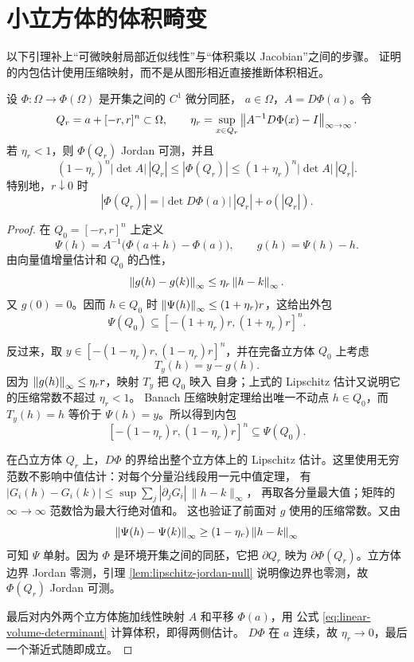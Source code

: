 \section{小立方体的体积畸变}

以下引理补上“可微映射局部近似线性”与“体积乘以 Jacobian”之间的步骤。
证明的内包估计使用压缩映射，而不是从图形相近直接推断体积相近。

\begin{lemma}[局部体积畸变]
\label{lem:local-volume-distortion}
设 \(\Phi:\Omega\to\Phi(\Omega)\) 是开集之间的 \(C^1\) 微分同胚，
\(a\in\Omega\)，\(A=D\Phi(a)\)。令
\[
 Q_r=a+[-r,r]^n\subset\Omega,
 \qquad
 \eta_r=\sup_{x\in Q_r}
 \left\lVert A^{-1}D\Phi(x)-I\right\rVert_{\infty\to\infty}.
\]
若 \(\eta_r<1\)，则 \(\Phi(Q_r)\) Jordan 可测，并且
\[
 (1-\eta_r)^n|\det A|\,|Q_r|
 \le |\Phi(Q_r)|
 \le(1+\eta_r)^n|\det A|\,|Q_r|.
\]
特别地，\(r\downarrow0\) 时
\[
 |\Phi(Q_r)|
 =|\det D\Phi(a)|\,|Q_r|+o(|Q_r|).
\]
\end{lemma}

\begin{proof}
在 \(Q_0=[-r,r]^n\) 上定义
\[
 \Psi(h)=A^{-1}\bigl(\Phi(a+h)-\Phi(a)\bigr),
 \qquad g(h)=\Psi(h)-h.
\]
由向量值增量估计和 \(Q_0\) 的凸性，
\[
 \left\lVert g(h)-g(k)\right\rVert_\infty
 \le\eta_r\left\lVert h-k\right\rVert_\infty.
\]
又 \(g(0)=0\)。因而 \(h\in Q_0\) 时
\(\left\lVert\Psi(h)\right\rVert_\infty\le(1+\eta_r)r\)，这给出外包
\[
 \Psi(Q_0)\subseteq[-(1+\eta_r)r,(1+\eta_r)r]^n.
\]

反过来，取
\(y\in[-(1-\eta_r)r,(1-\eta_r)r]^n\)，并在完备立方体 \(Q_0\) 上考虑
\[
 T_y(h)=y-g(h).
\]
因为 \(\left\lVert g(h)\right\rVert_\infty\le\eta_rr\)，映射 \(T_y\) 把 \(Q_0\) 映入
自身；上式的 Lipschitz 估计又说明它的压缩常数不超过 \(\eta_r<1\)。
Banach 压缩映射定理给出唯一不动点 \(h\in Q_0\)，而
\(T_y(h)=h\) 等价于 \(\Psi(h)=y\)。所以得到内包
\[
 [-(1-\eta_r)r,(1-\eta_r)r]^n\subseteq\Psi(Q_0).
\]

在凸立方体 \(Q_r\) 上，\(D\Phi\) 的界给出整个立方体上的 Lipschitz
估计。这里使用无穷范数不影响中值估计：对每个分量沿线段用一元中值定理，
有 \(|G_i(h)-G_i(k)|\le\sup\sum_j|\partial_jG_i|\,\|h-k\|_\infty\)，
再取各分量最大值；矩阵的 \(\infty\to\infty\) 范数恰为最大行绝对值和。
这也验证了前面对 \(g\) 使用的压缩常数。又由
\[
 \left\lVert\Psi(h)-\Psi(k)\right\rVert_\infty
 \ge(1-\eta_r)\left\lVert h-k\right\rVert_\infty
\]
可知 \(\Psi\) 单射。因为 \(\Phi\) 是环境开集之间的同胚，它把
\(\partial Q_r\) 映为 \(\partial\Phi(Q_r)\)。立方体边界 Jordan 零测，引理
\ref{lem:lipschitz-jordan-null} 说明像边界也零测，故 \(\Phi(Q_r)\)
Jordan 可测。

最后对内外两个立方体施加线性映射 \(A\) 和平移 \(\Phi(a)\)，用
公式 \eqref{eq:linear-volume-determinant} 计算体积，即得两侧估计。
\(D\Phi\) 在 \(a\) 连续，故
\(\eta_r\to0\)，最后一个渐近式随即成立。
\end{proof}

